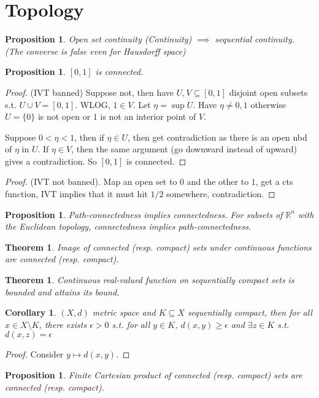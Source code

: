 \documentclass{article}
\theoremstyle{definition}
\theoremstyle{remark}
\theoremstyle{plain}
\newtheorem{thm}[defn]{Theorem}
\newtheorem{prop}[defn]{Proposition}
\newtheorem{crly}[defn]{Corollary}
\theoremstyle{definition}
\newcommand{\RR}{\mathbb{R}}
\begin{document}
\section{Topology}
\begin{prop}
    Open set continuity (Continuity) $\implies$ sequential continuity. (The converse is false even for Hausdorff space)
\end{prop}
\begin{prop}
    $[0,1]$ is connected.
\end{prop}
\begin{proof}
(IVT banned)
    Suppose not, then have $U,V\subseteq [0,1]$ disjoint open subsets s.t. $U\cup V=[0,1]$. WLOG, $1\in V$. Let $\eta=\sup U$. Have $\eta\neq0,1$ otherwise $U=\{0\}$ is not open or $1$ is not an interior point of $V$.
    
    Suppose $0<\eta<1$, then if $\eta\in U$, then get contradiction as there is an open nbd of $\eta$ in $U$. If $\eta\in V$, then the same argument (go downward instead of upward) gives a contradiction. So $[0,1]$ is connected.
\end{proof}
\begin{proof}
    (IVT not banned). Map an open set to $0$ and the other to $1$, get a cts function, IVT implies that it must hit $1/2$ somewhere, contradiction.
\end{proof}
\begin{prop}
    Path-connectedness implies connectedness. For subsets of $\RR^n$ with the Euclidean topology, connectedness implies path-connectedness. 
\end{prop}
\begin{thm}
    Image of connected (resp. compact) sets under continuous functions are connected (resp. compact).
\end{thm}
\begin{thm}
    Continuous real-valued function on sequentially compact sets is bounded and attains its bound.
\end{thm}
\begin{crly}
    $(X,d)$ metric space and $K\subseteq X$ sequentially compact, then for all $x\in X\setminus K$, there exists $\epsilon>0$ s.t. for all $y\in K$, $d(x,y)\ge\epsilon$ and $\exists z\in K$ s.t. $d(x,z)=\epsilon$
\end{crly}
\begin{proof}
    Consider $y\mapsto d(x,y)$.
\end{proof}
\begin{prop}
    Finite Cartesian product of connected (resp. compact) sets are connected (resp. compact).
\end{prop}
\end{document}
